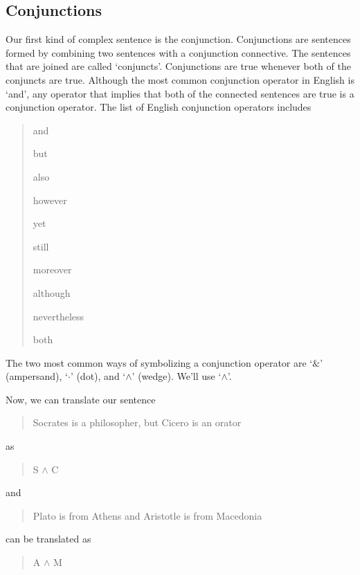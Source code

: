 \documentclass[../logic-text.tex]{subfiles}
\begin{document}
\subsection{Conjunctions}
\label{sec:conjunctions}

Our first kind of complex sentence is the conjunction. Conjunctions are sentences formed by combining two sentences with a conjunction connective. The sentences that are joined are called \enquote*{conjuncts}. Conjunctions are true whenever both of the conjuncts are true. Although the most common conjunction operator in English is \enquote*{and}, any operator that implies that both of the connected sentences are true is a conjunction operator. The list of English conjunction operators includes

\begin{quote}

  and

  but

  also

  however

  yet

  still

  moreover

  although

  nevertheless

  both
\end{quote}

The two most common ways of symbolizing a conjunction operator are  \enquote*{\(\mathbin{\&}\)} (ampersand),  \enquote*{\(\cdot\)} (dot), and \enquote*{\(\wedge\)} (wedge). We'll use \enquote*{\(\land\)}. 

Now, we can translate our sentence

\begin{quote}
Socrates is a philosopher, but Cicero is an orator
\end{quote}

as

\begin{quote}
  S \(\land\) C
\end{quote}

and


\begin{quote}
  Plato is from Athens and Aristotle is from Macedonia
\end{quote}

can be translated as

\begin{quote}
  A \(\land\) M
\end{quote}
\end{document}
